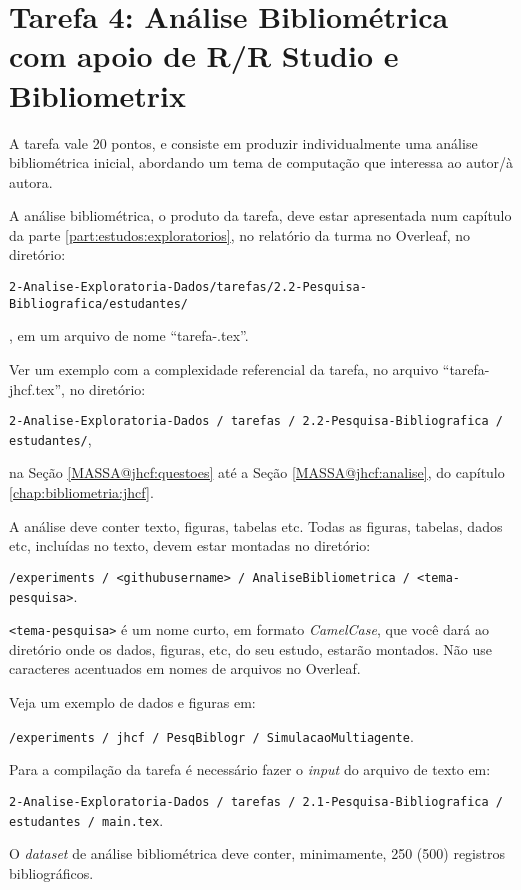 \chapter{Tarefa 4: Análise Bibliométrica com apoio de R/R Studio e Bibliometrix}

A tarefa vale 20 pontos, e consiste em produzir individualmente uma análise bibliométrica inicial, abordando um tema de computação que  interessa ao autor/à autora. 

A análise bibliométrica, o produto da tarefa, deve estar apresentada num capítulo da parte \ref{part:estudos:exploratorios}, no relatório da turma no Overleaf, no diretório:

{\footnotesize
\verb|2-Analise-Exploratoria-Dados/tarefas/2.2-Pesquisa-Bibliografica/estudantes/|
}

, em um arquivo de nome ``tarefa-\githubusername.tex''. 

Ver um exemplo com a complexidade referencial da tarefa, no arquivo ``tarefa-jhcf.tex'', no diretório:

{\footnotesize
\verb|2-Analise-Exploratoria-Dados / tarefas / 2.2-Pesquisa-Bibliografica / estudantes/|, 
}

na Seção \ref{MASSA@jhcf:questoes} até a Seção  \ref{MASSA@jhcf:analise}, do capítulo \ref{chap:bibliometria:jhcf}. 

A análise deve conter texto, figuras, tabelas  etc. Todas as figuras, tabelas, dados etc, incluídas no texto, devem estar montadas no diretório:

{\footnotesize
\verb|/experiments / <githubusername> / AnaliseBibliometrica / <tema-pesquisa>|. 
}

\verb|<tema-pesquisa>| é um nome curto, em formato \textit{CamelCase}, que você dará ao diretório onde os dados, figuras, etc, do seu estudo, estarão montados. Não use caracteres acentuados em nomes de arquivos no Overleaf.

Veja um exemplo de dados e figuras em:

{\footnotesize
\verb|/experiments / jhcf / PesqBiblogr / SimulacaoMultiagente|.
}

Para a compilação da tarefa é necessário fazer o \textit{input} do arquivo de texto em:

{\footnotesize
\verb|2-Analise-Exploratoria-Dados / tarefas / 2.1-Pesquisa-Bibliografica / estudantes / main.tex|.
}

O \textit{dataset} de análise bibliométrica deve conter, minimamente, 250 (500) registros bibliográficos.

